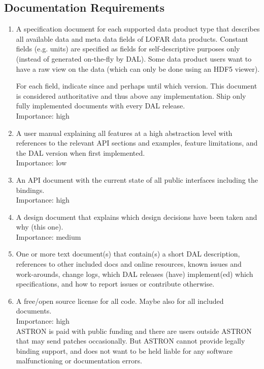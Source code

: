 \documentclass[a4paper,11pt]{article}
\begin{document}
\subsection{Documentation Requirements} \label{sec:doc_reqs}
\begin{enumerate}[resume, label=\it R.\arabic{*}]
\itemsep0em

\item \label{req:doc_spec} A specification document for each supported data product type that describes all available data and meta data fields of LOFAR data products.
Constant fields (e.g. units) are specified as fields for self-descriptive purposes only (instead of generated on-the-fly by DAL).
Some data product users want to have a raw view on the data (which can only be done using an HDF5 viewer).

For each field, indicate since and perhaps until which version.
This document is considered authoritative and thus above any implementation.
Ship only fully implemented documents with every DAL release.\\
Importance: high\\

\item \label{req:doc_user_manual} A user manual explaining all features at a high abstraction level with references to the relevant API sections and examples, feature limitations, and the DAL version when first implemented.\\
Importance: low\\

\item \label{req:doc_api} An API document with the current state of all public interfaces including the bindings.\\
Importance: high\\

\item \label{req:doc_design_decisions} A design document that explains which design decisions have been taken and why (this one).\\
Importance: medium\\

\item \label{req:doc_misc} One or more text document(s) that contain(s) a short DAL description, references to other included docs and online resources, known issues and work-arounds, change logs, which DAL releases (have) implement(ed) which specifications, and how to report issues or contribute otherwise.

\item \label{req:doc_license} A free/open source license for all code. Maybe also for all included documents.\\
Importance: high\\
ASTRON is paid with public funding and there are users outside ASTRON that may send patches occasionally.
But ASTRON cannot provide legally binding support, and does not want to be held liable for any software malfunctioning or documentation errors.

\end{enumerate}
\end{document}
